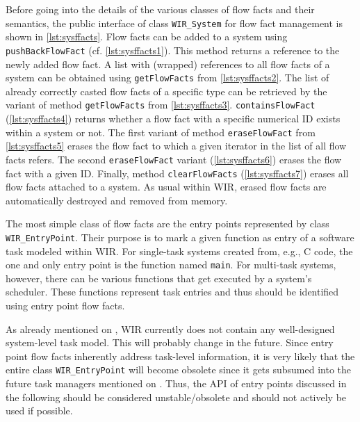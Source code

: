 Before going into the details of the various classes of flow facts and their semantics, the public interface of class \texttt{WIR\_System} for flow fact management is shown in \cref{lst:sysffacts}.
Flow facts can be added to a system using \texttt{pushBackFlowFact} (cf. \cref{lst:sysffacts1}).
This method returns a reference to the newly added flow fact.
A list with (wrapped) references to all flow facts of a system can be obtained using \texttt{getFlowFacts} from \cref{lst:sysffacts2}.
The list of already correctly casted flow facts of a specific type can be retrieved by the variant of method \texttt{getFlowFacts} from \cref{lst:sysffacts3}.
\texttt{containsFlowFact} (\cref{lst:sysffacts4}) returns whether a flow fact with a specific numerical ID exists within a system or not.
The first variant of method \texttt{eraseFlowFact} from \cref{lst:sysffacts5} erases the flow fact to which a given iterator in the list of all flow facts refers.
The second \texttt{eraseFlowFact} variant (\cref{lst:sysffacts6}) erases the flow fact with a given ID.
Finally, method \texttt{clearFlowFacts} (\cref{lst:sysffacts7}) erases all flow facts attached to a system.
As usual within \gls{WIR}, erased flow facts are automatically destroyed and removed from memory.

The most simple class of flow facts are the entry points represented by class \texttt{WIR\_EntryPoint}.
Their purpose is to mark a given function as entry of a software task modeled within \gls{WIR}.
For single-task systems created from, e.g., C code, the one and only entry point is the function named \texttt{main}.
For multi-task systems, however, there can be various functions that get executed by a system's scheduler.
These functions represent task entries and thus should be identified using entry point flow facts.

\begin{wirNote}
  As already mentioned on , \gls{WIR} currently does not contain any well-designed system-level task model.
  This will probably change in the future.
  Since entry point flow facts inherently address task-level information, it is very likely that the entire class \texttt{WIR\_EntryPoint} will become obsolete since it gets subsumed into the future task managers mentioned on .
  Thus, the \gls{API} of entry points discussed in the following should be considered unstable/obsolete and should not actively be used if possible.
\end{wirNote}

